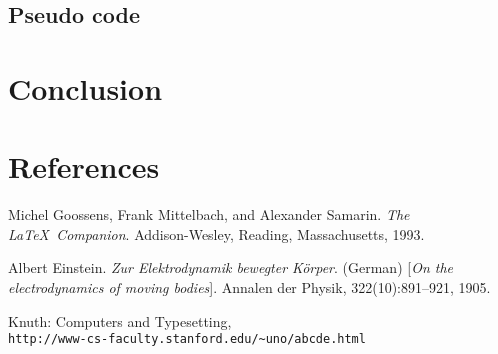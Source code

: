 \documentclass[10pt,a4paper,twocolumn]{article}
\begin{document}
	\subsection{Pseudo code}
	
	\section{Conclusion}
	\section{References}
	
	
	\begin{thebibliography}{9}
		Michel Goossens, Frank Mittelbach, and Alexander Samarin. 
		\textit{The \LaTeX\ Companion}. 
		Addison-Wesley, Reading, Massachusetts, 1993.
		
		Albert Einstein. 
		\textit{Zur Elektrodynamik bewegter K{\"o}rper}. (German) 
		[\textit{On the electrodynamics of moving bodies}]. 
		Annalen der Physik, 322(10):891–921, 1905.
		
		Knuth: Computers and Typesetting,
		\\\texttt{http://www-cs-faculty.stanford.edu/\~{}uno/abcde.html}
	\end{thebibliography}
	
\end{document}

